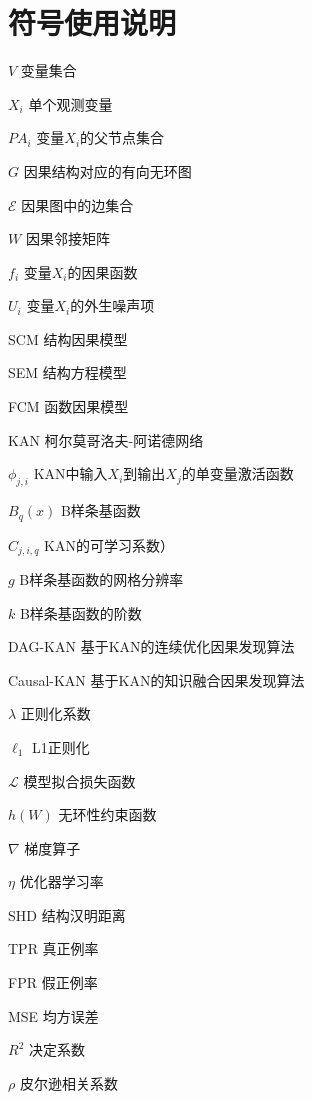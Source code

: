 \chapter*{符号使用说明}

\begin{denotation}
	
	\item[$V$]           变量集合
	\item[$X_{i}$]       单个观测变量
	\item[$PA_{i}$]      变量$X_{i}$的父节点集合
	\item[$G$]           因果结构对应的有向无环图
	\item[$\mathcal{E}$] 因果图中的边集合
	\item[$W$]           因果邻接矩阵
	\item[$f_{i}$]       变量$X_{i}$的因果函数
	\item[$U_{i}$]       变量$X_{i}$的外生噪声项
	\item[SCM]           结构因果模型
	\item[SEM]           结构方程模型
	\item[FCM]           函数因果模型
	
	\item[KAN]           柯尔莫哥洛夫-阿诺德网络
	\item[$\phi_{j,i}$]  KAN中输入$X_{i}$到输出$X_{j}$的单变量激活函数
	\item[$B_{q}(x)$]    B样条基函数
	\item[$C_{j,i,q}$]   KAN的可学习系数）
	\item[$g$]           B样条基函数的网格分辨率
	\item[$k$]           B样条基函数的阶数
	
	\item[DAG-KAN]       基于KAN的连续优化因果发现算法
	\item[Causal-KAN]    基于KAN的知识融合因果发现算法
	\item[$\lambda$]     正则化系数
	\item[$\ell_{1}$]    L1正则化
	\item[$\mathcal{L}$] 模型拟合损失函数
	\item[$h(W)$]        无环性约束函数
	\item[$\nabla$]      梯度算子
	\item[$\eta$]        优化器学习率
	
	\item[SHD]           结构汉明距离
	\item[TPR]           真正例率
	\item[FPR]           假正例率
	\item[MSE]           均方误差
	\item[$R^{2}$]       决定系数
	\item[$\rho$]        皮尔逊相关系数
	

\end{denotation}
